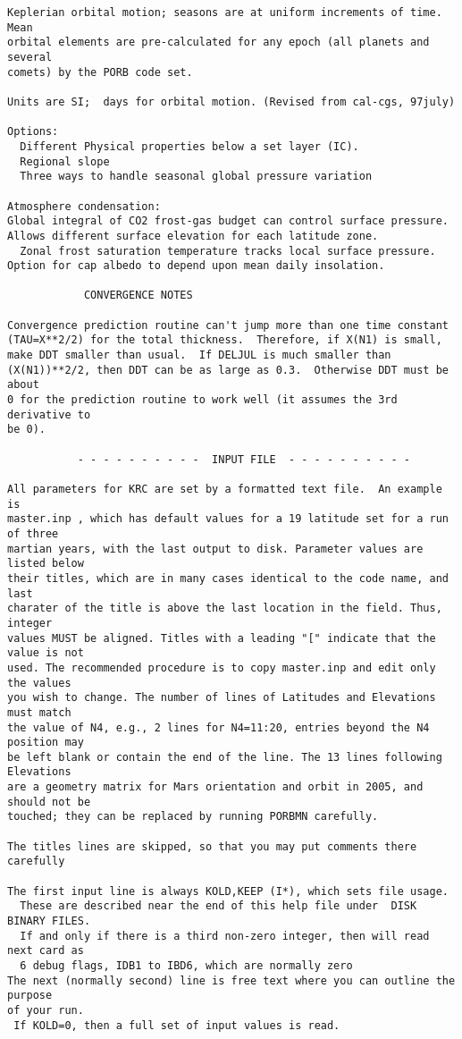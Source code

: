 \begin{verbatim}
Keplerian orbital motion; seasons are at uniform increments of time. Mean 
orbital elements are pre-calculated for any epoch (all planets and several
comets) by the PORB code set.

Units are SI;  days for orbital motion. (Revised from cal-cgs, 97july)

Options:
  Different Physical properties below a set layer (IC).
  Regional slope
  Three ways to handle seasonal global pressure variation

Atmosphere condensation: 
Global integral of CO2 frost-gas budget can control surface pressure.
Allows different surface elevation for each latitude zone.
  Zonal frost saturation temperature tracks local surface pressure.
Option for cap albedo to depend upon mean daily insolation.

			CONVERGENCE NOTES

Convergence prediction routine can't jump more than one time constant
(TAU=X**2/2) for the total thickness.  Therefore, if X(N1) is small,
make DDT smaller than usual.  If DELJUL is much smaller than 
(X(N1))**2/2, then DDT can be as large as 0.3.  Otherwise DDT must be about
0 for the prediction routine to work well (it assumes the 3rd derivative to
be 0).

           - - - - - - - - - -  INPUT FILE  - - - - - - - - - - 

All parameters for KRC are set by a formatted text file.  An example is
master.inp , which has default values for a 19 latitude set for a run of three
martian years, with the last output to disk. Parameter values are listed below
their titles, which are in many cases identical to the code name, and last
charater of the title is above the last location in the field. Thus, integer
values MUST be aligned. Titles with a leading "[" indicate that the value is not
used. The recommended procedure is to copy master.inp and edit only the values
you wish to change. The number of lines of Latitudes and Elevations must match
the value of N4, e.g., 2 lines for N4=11:20, entries beyond the N4 position may
be left blank or contain the end of the line. The 13 lines following Elevations
are a geometry matrix for Mars orientation and orbit in 2005, and should not be
touched; they can be replaced by running PORBMN carefully.

The titles lines are skipped, so that you may put comments there carefully

The first input line is always KOLD,KEEP (I*), which sets file usage.
  These are described near the end of this help file under  DISK BINARY FILES.
  If and only if there is a third non-zero integer, then will read next card as
  6 debug flags, IDB1 to IBD6, which are normally zero
The next (normally second) line is free text where you can outline the purpose 
of your run. 
 If KOLD=0, then a full set of input values is read. 


\end{verbatim}
